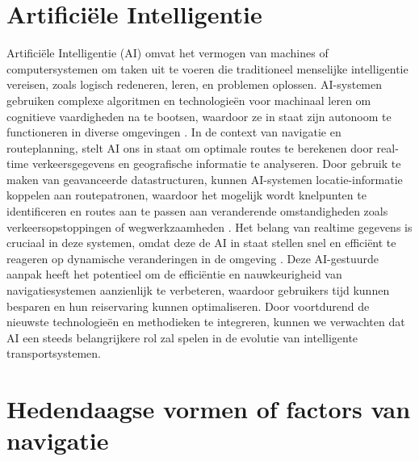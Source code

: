 \section{Artificiële Intelligentie}
\label{sec:artificiele-intelligentie}

Artificiële Intelligentie (AI) omvat het vermogen van machines of computersystemen om taken uit te voeren die traditioneel menselijke intelligentie vereisen, zoals logisch redeneren, leren, en problemen oplossen. AI-systemen gebruiken complexe algoritmen en technologieën voor machinaal leren om cognitieve vaardigheden na te bootsen, waardoor ze in staat zijn autonoom te functioneren in diverse omgevingen \autocite{Sabouret2020}. In de context van navigatie en routeplanning, stelt AI ons in staat om optimale routes te berekenen door real-time verkeersgegevens en geografische informatie te analyseren. Door gebruik te maken van geavanceerde datastructuren, kunnen AI-systemen locatie-informatie koppelen aan routepatronen, waardoor het mogelijk wordt knelpunten te identificeren en routes aan te passen aan veranderende omstandigheden zoals verkeersopstoppingen of wegwerkzaamheden \autocite{Soni2023a,Ruta2010}. Het belang van realtime gegevens is cruciaal in deze systemen, omdat deze de AI in staat stellen snel en efficiënt te reageren op dynamische veranderingen in de omgeving \autocite{Ciravegna2018}. Deze AI-gestuurde aanpak heeft het potentieel om de efficiëntie en nauwkeurigheid van navigatiesystemen aanzienlijk te verbeteren, waardoor gebruikers tijd kunnen besparen en hun reiservaring kunnen optimaliseren. Door voortdurend de nieuwste technologieën en methodieken te integreren, kunnen we verwachten dat AI een steeds belangrijkere rol zal spelen in de evolutie van intelligente transportsystemen.


\section{Hedendaagse vormen of factors van navigatie}
\label{sec:literatuuroverzicht}


